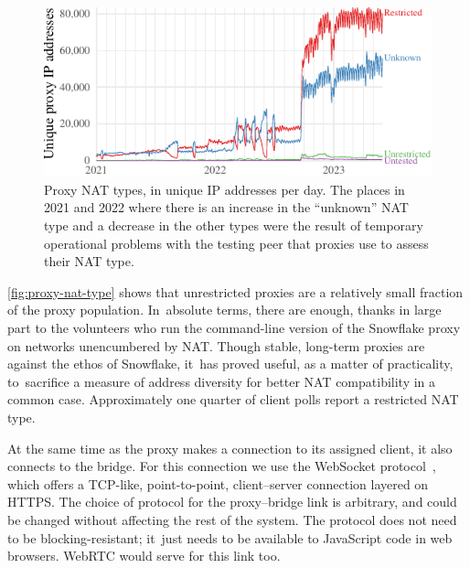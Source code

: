 \documentclass[letterpaper,twocolumn]{article}
\begin{document}
\begin{figure}
\includegraphics{figures/proxies/proxy-nat-type}
\caption{
Proxy NAT types, in unique IP addresses per day.
The places in 2021 and 2022
where there is an increase in the ``unknown'' NAT type
and a decrease in the other types
were the result of temporary operational problems with the
testing peer that proxies use to assess their NAT type.
}
\label{fig:proxy-nat-type}
\end{figure}

\autoref{fig:proxy-nat-type}
shows that unrestricted proxies are
a relatively small fraction of the proxy population.
In~absolute terms, there are enough,
thanks in large part to the volunteers who run
the command-line
version of the Snowflake proxy
on networks unencumbered by NAT.
Though stable, long-term proxies are
against the ethos of Snowflake,
it~has proved useful, as a matter of practicality,
to~sacrifice a measure of address diversity
for better NAT compatibility in a common case.
Approximately one quarter of client polls
report a restricted NAT type.

At the same time as the proxy makes a connection to its assigned client,
it also connects to the bridge.
For this connection we
use the WebSocket protocol~\cite{rfc6455}, which
offers a TCP-like, point-to-point, client--server connection
layered on HTTPS.
The choice of protocol for the proxy--bridge link is arbitrary,
and could be changed
without affecting the rest of the system.
The protocol does not need to be blocking-resistant;
it~just needs to be available to JavaScript code in web browsers.
WebRTC would serve for this link too.
\end{document}
